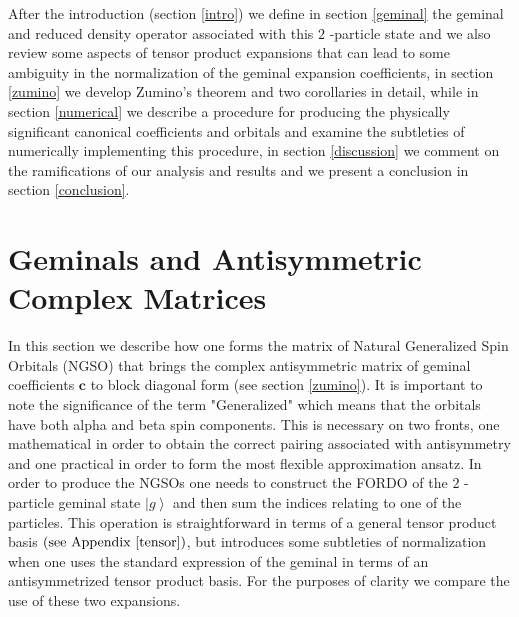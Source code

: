 \documentclass[aps,preprint]{revtex4}%
\begin{document}
After the introduction (section \ref{intro}) we define in section
\ref{geminal} the geminal and reduced density operator associated with this
$2$ -particle state and we also review some aspects of tensor product
expansions that can lead to some ambiguity in the normalization of the geminal
expansion coefficients, in section \ref{zumino} we develop Zumino's theorem
and two corollaries in detail, while in section \ref{numerical} we describe a
procedure for producing the physically significant canonical coefficients and
orbitals and examine the subtleties of numerically implementing this
procedure, in section \ref{discussion} we comment on the ramifications of our
analysis and results and we present a conclusion in section \ref{conclusion}.

\section{Geminals and Antisymmetric Complex Matrices\label{geminal}}

In this section we describe how one forms the matrix of Natural Generalized
Spin Orbitals (NGSO) that brings the complex antisymmetric matrix of geminal
coefficients $\mathbf{c}$\textbf{ }to block diagonal form (see section
\ref{zumino}). It is important to note the significance of the term
"Generalized" which means that the orbitals have both alpha and beta spin
components. This is necessary on two fronts, one mathematical in order to
obtain the correct pairing associated with antisymmetry and one practical in
order to form the most flexible approximation ansatz. In order to produce the
NGSOs one needs to construct the FORDO of the $2$ -particle geminal state
$\left\vert g\right\rangle $ and then sum the indices relating to one of the
particles.\textbf{ }This operation is straightforward in terms of a general
tensor product basis $\left(  \text{see Appendix \ref{tensor}}\right)  $, but
introduces some subtleties of normalization when one uses the standard
expression of the geminal in terms of an antisymmetrized tensor product basis.
For the purposes of clarity we compare the use of these two expansions.
\end{document}
